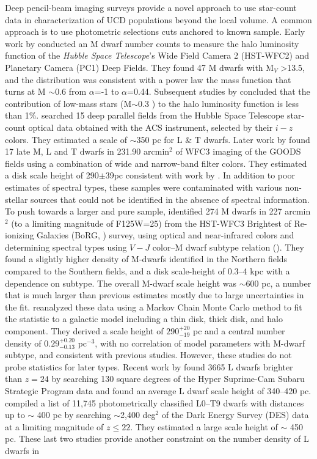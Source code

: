 \documentclass[manuscript]{aastex63}
\begin{document}
Deep pencil-beam imaging surveys provide a novel approach to use star-count data in characterization of UCD populations beyond the local volume. A common approach is to use photometric selections cuts anchored to known sample. Early work by \cite{1997ApJ...482..913G} conducted an M dwarf number counts to measure the halo luminosity function of the \textit{Hubble Space Telescope}'s Wide Field Camera 2 (HST-WFC2) and Planetary Camera (PC1) Deep Fields. They found 47 M dwarfs with M$_V$ \textgreater 13.5, and the distribution was consistent with a power law the mass function that turns at M $\sim$0.6 \Msun from $\alpha$=-1 to $\alpha$=0.44. Subsequent studies by \cite{1997A&A...328....5K, 1997A&A...328...83C} concluded that the contribution of low-mass stars (M$\sim$0.3 \Msun ) to the halo luminosity function is less than 1\%. \cite{2005ApJ...631L.159R} searched 15 deep parallel fields from the Hubble Space Telescope star-count optical data obtained with the ACS instrument, selected by their \textit{$i-z$} colors. They estimated a scale of $\sim$350 pc for L \& T dwarfs. Later work by \cite{Ryan2011} found 17 late M, L and T dwarfs in 231.90 arcmin$^2$ of WFC3 imaging of the GOODS fields using a combination of wide and narrow-band filter colors. They estimated a disk scale height of 290$\pm$39pc consistent with work by \cite{2005ApJ...622..319P}. In addition to poor estimates of spectral types, these samples were contaminated with various non-stellar sources that could not be identified in the absence of spectral information. To push towards a larger and pure sample, \cite{Holwerda2014} identified 274 M dwarfs in 227 arcmin$^2$ (to a limiting magnitude of F125W=25) from the HST-WFC3 Brightest of Re-ionizing Galaxies (BoRG, \citealt{2009ApJ...695.1591P}) survey, using optical and near-infrared colors and determining spectral types using $V-J$ color--M dwarf subtype relation (\citealt{2009ApJ...695.1591P}). They found a slightly higher density of M-dwarfs identified in the Northern fields compared to the Southern fields, and a  disk scale-height of 0.3--4 kpc with a dependence on subtype. The overall M-dwarf scale height was $\sim$600 pc, a number that is much larger than previous estimates mostly due to large uncertainties in the fit. \cite{Vledder2016} reanalyzed these data using a Markov Chain Monte Carlo method to fit the statistic to a galactic model including a thin disk, thick disk, and halo component. They derived a scale height of $290^{+20}_{-19}$ pc and a central number density of $0.29^{+0.20}_{-0.13}$ pc$^{-3}$, with no correlation of model parameters with M-dwarf subtype, and consistent with previous studies. However, these studies do not probe statistics for later types. Recent work by \cite{Sorahana2018} found 3665 L dwarfs brighter than $z=24$ by searching 130 square degrees of the Hyper Suprime-Cam Subaru Strategic Program data and found an average L dwarf scale height of 340--420 pc. \cite{2019arXiv190310806C} compiled a list of 11,745 photometrically classified L0--T9 dwarfs with distances up to $\sim$ 400 pc by searching $\sim$2,400 deg$^2$ of the Dark Energy Survey (DES) data at a limiting magnitude of $z\leqslant22$. They estimated a large scale height of $\sim$ 450 pc. These last two studies provide another constraint on the number density of L dwarfs in 
\end{document}
